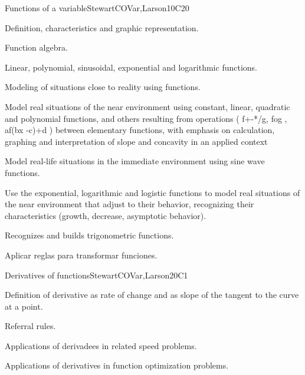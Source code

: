 \begin{syllabus}
\begin{unit}{Functions of a variable}{}{StewartCOVar,Larson}{10}{C20}
   \begin{topics}
      \item Definition, characteristics and graphic representation.
      \item Function algebra.
      \item Linear, polynomial, sinusoidal, exponential and logarithmic functions.
      \item Modeling of situations close to reality using functions.
   \end{topics}

   \begin{learningoutcomes}
      \item Model real situations of the near environment using constant, linear, quadratic and polynomial functions, and others resulting from operations ( f+-*/g, fog , af(bx -c)+d ) between elementary functions, with emphasis on calculation, graphing and interpretation of slope and concavity in an applied context 
      \item Model real-life situations in the immediate environment using sine wave functions.
      \item Use the exponential, logarithmic and logistic functions to model real situations of the near environment that adjust to their behavior, recognizing their characteristics (growth, decrease, asymptotic behavior).
      \item Recognizes and builds trigonometric functions.
      \item Aplicar reglas para transformar funciones.
   \end{learningoutcomes}
\end{unit}

\begin{unit}{Derivatives of functions}{}{StewartCOVar,Larson}{20}{C1}
   \begin{topics}
      \item Definition of derivative as rate of change and as slope of the tangent to the curve at a point.
      \item Referral rules.
      \item Applications of derivadees in related speed problems.
      \item Applications of derivatives in function optimization problems.
   \end{topics}


\end{unit}
\end{syllabus}
